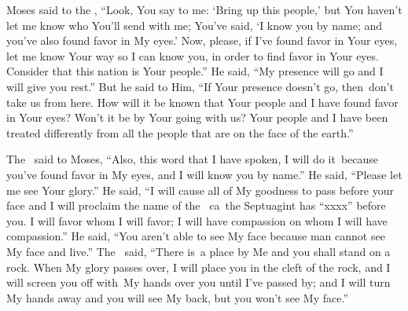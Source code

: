 \begin{inparaenum}
   Moses said to the \lord, ``Look, You say to me: `Bring up this people,' but You haven't let me know who You'll send with me; You've said, `I know you by name; and you've also found favor in My eyes.'%
   Now, please, if I've found favor in Your eyes, let me know Your way so I can know you, in order to find favor in Your eyes. Consider that this nation is Your people.''%
   He said, ``My presence will go and I will give you rest.''%
   But he said to Him, ``If Your presence doesn't go, then\understood\ don't take us from here.%
   How will it be known that Your people and I have found favor in Your eyes? Won't it be by Your going with us? Your people and I have been treated differently from all the people that are on the face of the earth.''%
  
   The \lord\ said to Moses, ``Also, this word that I have spoken, I will do it\understood\ because you've found favor in My eyes, and I will know you by name.''%
   He said, ``Please let me see Your glory.''%
   He said, ``I will cause all of My goodness to pass before your face and I will proclaim the name of the \lord\ ca{\septuagint\ }{the Septuagint has ``xxxx''} before you. I will favor whom I will favor; I will have compassion on whom I will have compassion.''%
   He said, ``You aren't able to see My face because man cannot see My face and live.''%
   The \lord\ said, ``There is\understood\ a place by Me and you shall stand on a rock.%
   When My glory passes over, I will place you in the cleft of the rock, and I will screen you off with\understood\ My hands over you until I've passed by;%
   and I will turn My hands away and you will see My back, but you won't see My face.''%
\end{inparaenum}

